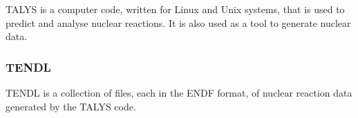 TALYS is a computer code, written for Linux and Unix systems, that is used to predict and analyse nuclear reactions.  It is also used as a tool to generate nuclear data.

\subsubsection{TENDL}

TENDL is a collection of files, each in the ENDF format, of nuclear reaction data generated by the TALYS code.







